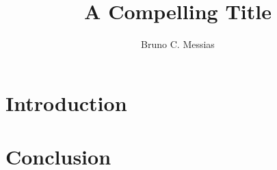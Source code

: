 \documentclass{article}
\title{A Compelling Title}
\author{Bruno C. Messias}
\date{}
\begin{document}
\maketitle

\section{Introduction}



\subsection{}

\subsection{}

\subsection{}


\section{Conclusion}
\end{document}
